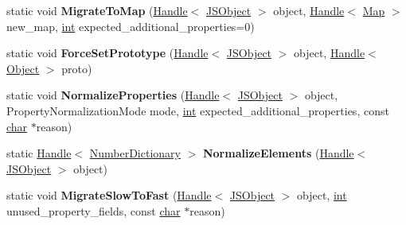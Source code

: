 \begin{DoxyCompactItemize}
\item 
\mbox{\label{classv8_1_1internal_1_1JSObject_ab60efe6c24eef80f411f54d9c6d89771}} 
static void {\bfseries Migrate\+To\+Map} (\mbox{\hyperlink{classv8_1_1internal_1_1Handle}{Handle}}$<$ \mbox{\hyperlink{classv8_1_1internal_1_1JSObject}{J\+S\+Object}} $>$ object, \mbox{\hyperlink{classv8_1_1internal_1_1Handle}{Handle}}$<$ \mbox{\hyperlink{classv8_1_1internal_1_1Map}{Map}} $>$ new\+\_\+map, \mbox{\hyperlink{classint}{int}} expected\+\_\+additional\+\_\+properties=0)
\item 
\mbox{\label{classv8_1_1internal_1_1JSObject_ae9c2b076f5af2c1cb6d9e7ed461d4444}} 
static void {\bfseries Force\+Set\+Prototype} (\mbox{\hyperlink{classv8_1_1internal_1_1Handle}{Handle}}$<$ \mbox{\hyperlink{classv8_1_1internal_1_1JSObject}{J\+S\+Object}} $>$ object, \mbox{\hyperlink{classv8_1_1internal_1_1Handle}{Handle}}$<$ \mbox{\hyperlink{classv8_1_1internal_1_1Object}{Object}} $>$ proto)
\item 
\mbox{\label{classv8_1_1internal_1_1JSObject_a5026b2a0ec46caabc4122ea7010608e4}} 
static void {\bfseries Normalize\+Properties} (\mbox{\hyperlink{classv8_1_1internal_1_1Handle}{Handle}}$<$ \mbox{\hyperlink{classv8_1_1internal_1_1JSObject}{J\+S\+Object}} $>$ object, Property\+Normalization\+Mode mode, \mbox{\hyperlink{classint}{int}} expected\+\_\+additional\+\_\+properties, const \mbox{\hyperlink{classchar}{char}} $\ast$reason)
\item 
\mbox{\label{classv8_1_1internal_1_1JSObject_a99e894d642aae160e50b9358d2116cbc}} 
static \mbox{\hyperlink{classv8_1_1internal_1_1Handle}{Handle}}$<$ \mbox{\hyperlink{classv8_1_1internal_1_1NumberDictionary}{Number\+Dictionary}} $>$ {\bfseries Normalize\+Elements} (\mbox{\hyperlink{classv8_1_1internal_1_1Handle}{Handle}}$<$ \mbox{\hyperlink{classv8_1_1internal_1_1JSObject}{J\+S\+Object}} $>$ object)
\item 
\mbox{\label{classv8_1_1internal_1_1JSObject_a663c5f054f780e77e595402eef1c4d1e}} 
static void {\bfseries Migrate\+Slow\+To\+Fast} (\mbox{\hyperlink{classv8_1_1internal_1_1Handle}{Handle}}$<$ \mbox{\hyperlink{classv8_1_1internal_1_1JSObject}{J\+S\+Object}} $>$ object, \mbox{\hyperlink{classint}{int}} unused\+\_\+property\+\_\+fields, const \mbox{\hyperlink{classchar}{char}} $\ast$reason)

\end{DoxyCompactItemize}
